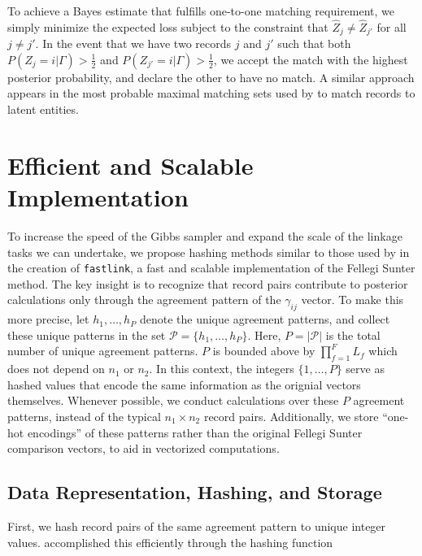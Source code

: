 \documentclass[ba]{imsart}
\begin{document}
To achieve a Bayes estimate that fulfills one-to-one matching requirement, we simply minimize the expected loss subject to the constraint that $\hat{Z}_j \neq \hat{Z}_{j'}$ for all $j \neq j'$. In the event that we have two records $j$ and $j'$ such that both $P(Z_j = i |\Gamma) > \frac{1}{2}$ and $ P(Z_{j'} = i |\Gamma) > \frac{1}{2}$, we accept the match with the highest posterior probability, and declare the other to have no match. A similar approach appears in the most probable maximal matching sets used by \cite{steorts_bayesian_2016} to match records to latent entities.

\section{Efficient and Scalable Implementation}
\label{sec:efficiency}

To increase the speed of the Gibbs sampler and expand the scale of the linkage tasks we can undertake, we propose hashing methods similar to those used by \cite{enamorado2019using} in the creation of \texttt{fastlink}, a fast and scalable implementation of the Fellegi Sunter method. The key insight is to recognize that record pairs contribute to posterior calculations only through the agreement pattern of the $\gamma_{ij}$ vector. To make this more precise, let $h_1, \ldots, h_P$ denote the unique agreement patterns, and collect these unique patterns in the set $\mathcal{P} = \{h_1, \ldots, h_P\}$. Here, 
$P = |\mathcal{P}|$ is the total number of unique agreement
patterns. \(P\) is bounded above by \(\prod_{f=1}^F L_f\) which does not depend on \(n_1\) or \(n_2\). In this context, the integers $\{1, \ldots, P\}$ serve as hashed values that encode the same information as the orignial vectors themselves. Whenever possible, we conduct calculations over these \(P\) agreement patterns, instead of the typical \(n_1 \times n_2\) record pairs. Additionally, we store ``one-hot encodings'' of these patterns rather than the original Fellegi Sunter comparison vectors, to aid in vectorized computations.  

\hypertarget{data-representation-hashing-and-storage}{%
	\subsection{Data Representation, Hashing, and
		Storage}\label{data-representation-hashing-and-storage}}

First, we hash record pairs of the same agreement pattern to unique integer values. \cite{enamorado2019using} accomplished this efficiently through the hashing function
\end{document}
